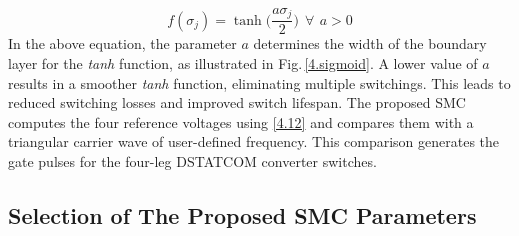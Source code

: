 \begin{equation} \label{4.13}
	f(\sigma_{j}) = \tanh\Big(\frac{a\sigma_{j}}{2} \Big) ~~ \forall ~\, a > 0
\end{equation} 
In the above equation, the parameter $a$ determines the width of the boundary layer for the \textit{tanh} function, as illustrated in Fig.\,\ref{4.sigmoid}. A lower value of $a$ results in a smoother \textit{tanh} function, eliminating multiple switchings. This leads to reduced switching losses and improved switch lifespan. The proposed SMC computes the four reference voltages using \eqref{4.12} and compares them with a triangular carrier wave of user-defined frequency. This comparison generates the gate pulses for the four-leg DSTATCOM converter switches.  

\vspace*{-0.9cm}
\subsection{Selection of The Proposed SMC Parameters}

